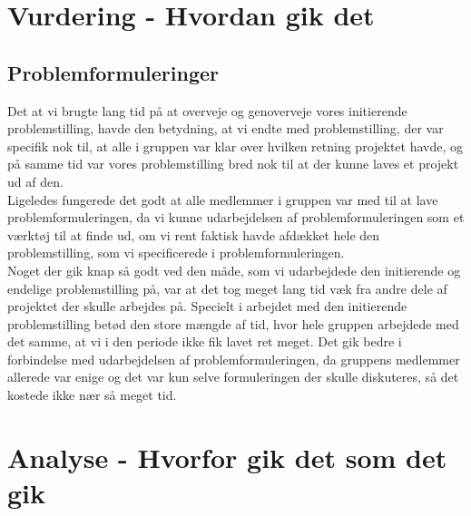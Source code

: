 \documentclass[a4paper,12pt,oneside,article]{memoir}
\begin{document}


\section{Vurdering - Hvordan gik det}



\subsection{Problemformuleringer}

        Det at vi brugte lang tid på at overveje og genoverveje vores initierende problemstilling, havde den betydning, at vi endte med problemstilling, der var specifik nok til, at alle i gruppen var klar over hvilken retning projektet havde, og på samme tid var vores problemstilling bred nok til at der kunne laves et projekt ud af den.\\
        Ligeledes fungerede det godt at alle medlemmer i gruppen var med til at lave problemformuleringen, da vi kunne udarbejdelsen af problemformuleringen som et værktøj til at finde ud, om vi rent faktisk havde afdækket hele den problemstilling, som vi specificerede i problemformuleringen.\\
        Noget der gik knap så godt ved den måde, som vi udarbejdede den initierende og endelige problemstilling på, var at det tog meget lang tid væk fra andre dele af projektet der skulle arbejdes på. Specielt i arbejdet med den initierende problemstilling betød den store mængde af tid, hvor hele gruppen arbejdede med det samme, at vi i den periode ikke fik lavet ret meget. Det gik bedre i forbindelse med udarbejdelsen af problemformuleringen, da gruppens medlemmer allerede var enige og det var kun selve formuleringen der skulle diskuteres, så det kostede ikke nær så meget tid.

    

    \section{Analyse - Hvorfor gik det som det gik}

    

    
\end{document}

